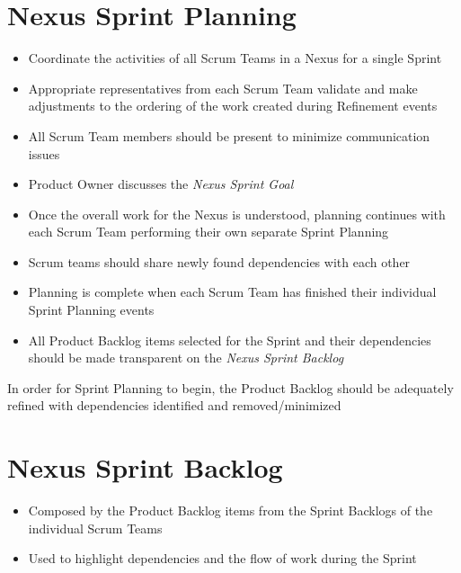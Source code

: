 \documentclass[a4paper,11pt,twocolumn]{article}
\begin{document}
\section*{Nexus Sprint Planning}
\begin{itemize}
	\item Coordinate the activities of all Scrum Teams in a Nexus for a single Sprint
	\item Appropriate representatives from each Scrum Team validate and make adjustments to the ordering of the work created during Refinement events
	\item All Scrum Team members should be present to minimize communication issues
	\item Product Owner discusses the \textit{Nexus Sprint Goal}
	\item Once the overall work for the Nexus is understood, planning continues with each Scrum Team performing their own separate Sprint Planning
	\item Scrum teams should share newly found dependencies with each other
	\item Planning is complete when each Scrum Team has finished their individual Sprint Planning events
	\item All Product Backlog items selected for the Sprint and their dependencies should be made transparent on the \textit{Nexus Sprint Backlog}
\end{itemize}

\begin{tcolorbox}[colback=black!8!white,colframe=gray!50!black,title=Note,sharp corners,fonttitle=\normalsize\bfseries,fontupper=\normalsize]
	In order for Sprint Planning to begin, the Product Backlog should be adequately refined with dependencies identified and removed/minimized
\end{tcolorbox}

\section*{Nexus Sprint Backlog}
\begin{itemize}
	\item Composed by the Product Backlog items from the Sprint Backlogs of the individual Scrum Teams
	\item Used to highlight dependencies and the flow of work during the Sprint
\end{itemize}
\end{document}
